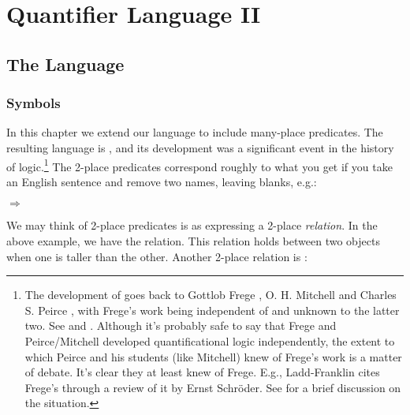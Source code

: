 
\chapter{Quantifier Language II}\label{quantifierlogic}

\section{The Language \GQL{}}


\subsection{Symbols}\label{Sec:GQLSymbols}
In this chapter we extend our language to include many-place predicates.  The resulting language is \GQL{}, and its development was a significant event in the history of logic.\footnote{%
	The development of \GQL{} goes back to Gottlob Frege \citeyearpar{Frege1879,Frege1891,Frege1893}, O. H. Mitchell \citeyearpar{Mitchell1883} and Charles S. Peirce \citeyearpar{Peirce1883}, with Frege's work being independent of and unknown to the latter two. See \citealp[288]{Church1956} and \citealp[34]{Hodges2001}.  %
 Although it's probably safe to say that Frege and Peirce/Mitchell developed quantificational logic independently, the extent to which Peirce and his students (like Mitchell) knew of Frege's work is a matter of debate.
It's clear they at least knew of Frege.
E.g., Ladd-Franklin \citeyearpar{LaddFranklin1883} cites Frege's \citeyearpar{Frege1879} through a review of it by Ernst Schr\"oder. 
See \citep{Dipert1984} for a brief discussion on the situation.}
The 2-place predicates correspond roughly to what you get if you take an English sentence and remove two names, leaving blanks, e.g.:

\begin{RESTARTmenumerate}
	\item {} $\Rightarrow$ 
\end{RESTARTmenumerate}

\noindent{}We may think of 2-place predicates is as expressing a 2-place \emph{relation}.  In the above example, we have the  relation.  This relation holds between two objects when one is taller than the other.  Another 2-place relation is :


